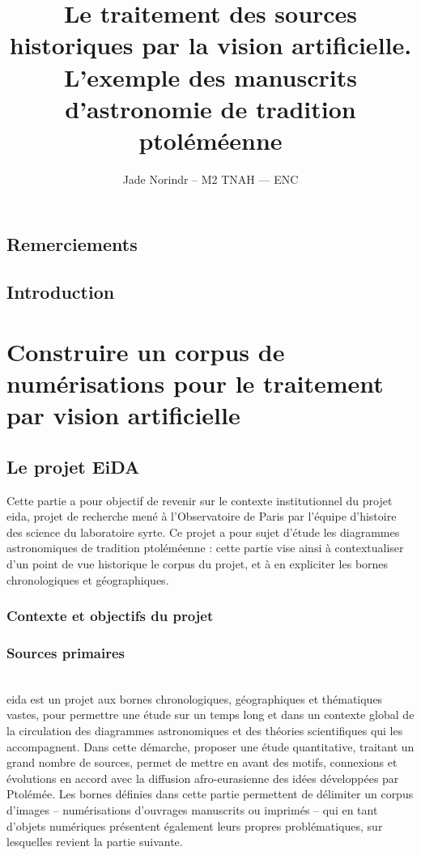 \documentclass[a4paper,12pt,twoside]{book}
\author{Jade Norindr – M2 TNAH — ENC}
\title{Le traitement des sources historiques par la vision artificielle. L'exemple des manuscrits d'astronomie de tradition ptoléméenne}
\newcommand{\eida}{\gls{eida}\xspace}
\newcommand{\clearemptydoublepage}{\newpage{\pagestyle{empty}\cleardoublepage}}
\newcommand\chapterNo[1]{
  \chapter*{#1}
  \markright{\MakeUppercase{#1}}
}
\begin{document}
\onehalfspacing 

\frontmatter

    

    \thispagestyle{empty}	
    \cleardoublepage
	
    
	
    \chapterNo{Remerciements}

    \printbibliography

    \chapterNo{Introduction}

    \thispagestyle{empty}
    \cleardoublepage

\mainmatter

    \part{Construire un corpus de numérisations pour le traitement par vision artificielle}
        \chapter{Le projet EiDA}
        Cette partie a pour objectif de revenir sur le contexte institutionnel du projet \eida, projet de recherche mené à l'Observatoire de Paris par l'équipe d'histoire des science du laboratoire \acrshort{syrte}. Ce projet a pour sujet d'étude les diagrammes astronomiques de tradition ptoléméenne : cette partie vise ainsi à contextualiser d'un point de vue historique le corpus du projet, et à en expliciter les bornes chronologiques et géographiques.
        
                \section{Contexte et objectifs du projet}
                    

                \section{Sources primaires}
                    
		\\
		
		\eida est un projet aux bornes chronologiques, géographiques et thématiques vastes, pour permettre une étude sur un temps long et dans un contexte global de la circulation des diagrammes astronomiques et des théories scientifiques qui les accompagnent. Dans cette démarche, proposer une étude quantitative, traitant un grand nombre de sources, permet de mettre en avant des motifs, connexions et évolutions en accord avec la diffusion afro-eurasienne des idées développées par Ptolémée. Les bornes définies dans cette partie permettent de délimiter un corpus d'images -- numérisations d'ouvrages manuscrits ou imprimés -- qui en tant d'objets numériques présentent également leurs propres problématiques, sur lesquelles revient la partie suivante.
        \clearemptydoublepage
        
\end{document}
